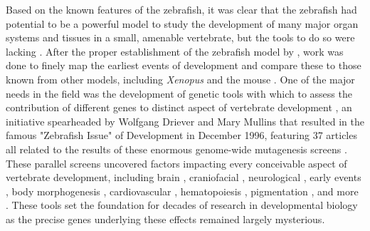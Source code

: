 Based on the known features of the zebrafish, it was clear that the zebrafish had potential to be a powerful model to study the development of many major organ systems and tissues in a small, amenable vertebrate, but the tools to do so were lacking \citep{Bakkers2011}. After the proper establishment of the zebrafish model by \citeauthor{Streisinger1981}, work was done to finely map the earliest events of development and compare these to those known from other models, including \textit{Xenopus} and the mouse \citep{Kimmel1988, Kimmel1989, Kimmel1995}. One of the major needs in the field was the development of genetic tools with which to assess the contribution of different genes to distinct aspect of vertebrate development \citep{Driever1994, Mullins1994}, an initiative spearheaded by Wolfgang Driever and Mary Mullins that resulted in the famous "Zebrafish Issue" of Development in December 1996, featuring 37 articles all related to the results of these enormous genome-wide mutagenesis screens \citep{Mullins2021, NussleinVolhard2012, Haffter1996, Driever1996, Knapik1996}. These parallel screens uncovered factors impacting every conceivable aspect of vertebrate development, including brain \citep{Schier1996, Heisenberg1996, Jiang1996, Brand1996b, Stemple1996, Odenthal1996a}, craniofacial \citep{Whitfield1996, Malicki1996b, Schilling1996, Piotrowski1996, Neuhauss1996}, neurological \citep{Malicki1996a, FurutaniSeiki1996, Abdelilah1996, Baier1996, Karlstrom1996, Trowe1996}, early events \citep{Kane1996a, Kane1996b}, body morphogenesis \citep{Brand1996a, vanEeden1996a, vanEeden1996b, Hammerschmidt1996a, Mullins1996, Hammerschmidt1996b}, cardiovascular \citep{Stainier1996, Chen1996}, hematopoiesis \citep{Weinstein1996, Ransom1996}, pigmentation \citep{Kelsh1996, Odenthal1996b}, and more \citep{Granato1996, Pack1996}. These tools set the foundation for decades of research in developmental biology as the precise genes underlying these effects remained largely mysterious.

